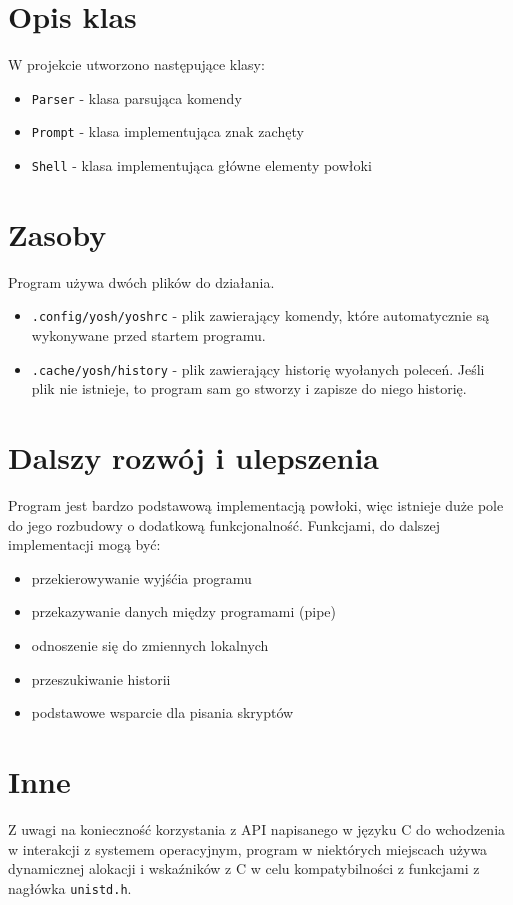 \documentclass{article}
\begin{document}
\section{Opis klas}

W projekcie utworzono następujące klasy:
\begin{itemize}
    \item \texttt{Parser} - klasa parsująca komendy
    \item \texttt{Prompt} - klasa implementująca znak zachęty
    \item \texttt{Shell}  - klasa implementująca główne elementy powłoki
\end{itemize}
     
\section{Zasoby}
Program używa dwóch plików do działania.
\begin{itemize}
    \item \texttt{.config/yosh/yoshrc} - plik zawierający komendy, które automatycznie są wykonywane przed startem 
    programu. 
    \item \texttt{.cache/yosh/history} - plik zawierający historię wyołanych poleceń. Jeśli plik nie istnieje, to
    program sam go stworzy i zapisze do niego historię.
\end{itemize}


\section{Dalszy rozwój i ulepszenia}
Program jest bardzo podstawową implementacją powłoki, więc istnieje duże pole do jego rozbudowy o dodatkową
funkcjonalność. Funkcjami, do dalszej implementacji mogą być:
\begin{itemize}
    \item przekierowywanie wyjśćia programu
    \item przekazywanie danych między programami (pipe)
    \item odnoszenie się do zmiennych lokalnych
    \item przeszukiwanie historii
    \item podstawowe wsparcie dla pisania skryptów
\end{itemize}

\section{Inne}

Z uwagi na konieczność korzystania z API napisanego w języku C do wchodzenia w interakcji z systemem operacyjnym,
program w niektórych miejscach używa dynamicznej alokacji i wskaźników z C w celu kompatybilności z funkcjami
z nagłówka \texttt{unistd.h}.
\end{document}
